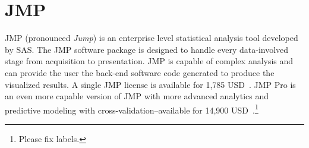 \section{JMP}

JMP (pronounced \textit{Jump}) is an enterprise level statistical
analysis tool developed by SAS. The JMP software package is designed
to handle every data-involved stage from acquisition to
presentation. JMP is capable of complex analysis and can provide the
user the back-end software code generated to produce the visualized
results. A single JMP license is available for 1,785
USD~\cite{JMPSAS}. JMP Pro is an even more capable version of JMP with
more advanced analytics and predictive modeling with
cross-validation--available for 14,900 USD~\cite{JMPPro}.\footnote{Please fix labels.}

